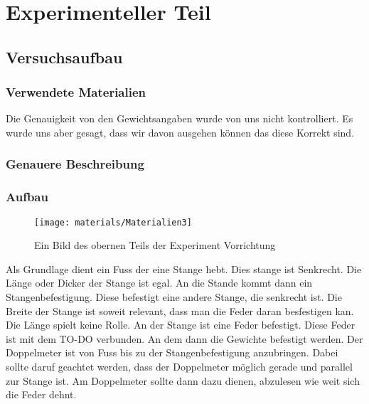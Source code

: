 \documentclass[../main.tex]{subfiles} %
\begin{document}
\section{Experimenteller Teil}\label{sec:experimenteller-teil}
    \subsection{Versuchsaufbau}\label{subsec:versuchsaufbau}
        \subsubsection{Verwendete Materialien}\label{subsubsec:zu-der-materialliste}
        \begin{tcolorbox}[title=Hinweis zu den Gewichtsangeben]
            Die Genauigkeit von den Gewichtsangaben wurde von uns nicht kontrolliert.
            Es wurde uns aber gesagt, dass wir davon ausgehen können das diese Korrekt sind.
        \end{tcolorbox}
        \subsubsection{Genauere Beschreibung}\label{subsubsec:materialien}

        \subsubsection{Aufbau}\label{subsubsec:aufbau}

        \begin{figure}[H]
            \centering
            \texttt{[image: materials/Materialien3]}
            \caption{Ein Bild des obernen Teils der Experiment Vorrichtung  \textcolor{blue}{\underline{}}}
            \label{fig:material3}
        \end{figure}

        Als Grundlage dient ein Fuss der eine Stange hebt. Dies stange ist Senkrecht.
        Die Länge oder Dicker der Stange ist egal. An die Stande kommt dann ein Stangenbefestigung.
        Diese befestigt eine andere Stange, die senkrecht ist.
        Die Breite der Stange ist soweit relevant, dass man die Feder daran besfestigen kan. Die Länge spielt keine Rolle.
        An der Stange ist eine Feder befestigt. Diese Feder ist mit dem TO-DO verbunden.
        An dem dann die Gewichte befestigt werden.
        Der Doppelmeter ist von Fuss bis zu der Stangenbefestigung anzubringen. Dabei sollte daruf geachtet werden, dass der Doppelmeter möglich gerade und parallel zur Stange ist.
        Am Doppelmeter sollte dann dazu dienen, abzulesen wie weit sich die Feder dehnt.
\end{document}
